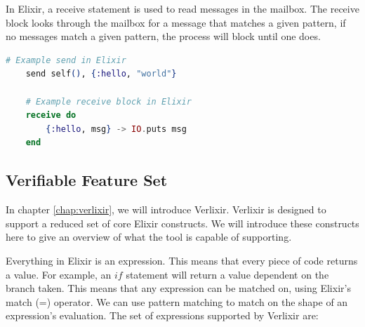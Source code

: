 \par
In Elixir, a receive statement is used to read messages in the mailbox. The receive block looks through the mailbox for a message that matches a given pattern, if no messages match a given pattern, the process will block until one does.
\begin{lstlisting}[language=Elixir, xleftmargin=.4\linewidth, caption={An example of spawn/1 and spawn/4 in Elixir for spawning a new lightweight process and a new Elixir node}]
    # Example send in Elixir
    send self(), {:hello, "world"}

    # Example receive block in Elixir
    receive do
        {:hello, msg} -> IO.puts msg
    end
\end{lstlisting}
\subsection{Verifiable Feature Set} \label{sec:verifiable_feature_set}
In chapter \ref{chap:verlixir}, we will introduce Verlixir. Verlixir is designed to support a reduced set of core Elixir constructs. We will introduce these constructs here to give an overview of what the tool is capable of supporting.
\par
Everything in Elixir is an expression. This means that every piece of code returns a value. For example, an $if$ statement will return a value dependent on the branch taken. This means that any expression can be matched on, using Elixir's match (=) operator. We can use pattern matching to match on the shape of an expression's evaluation. The set of expressions supported by Verlixir are:
